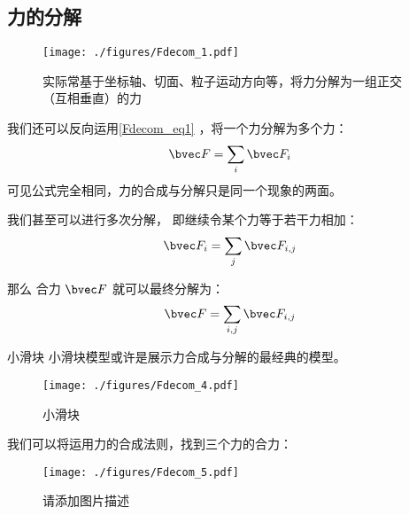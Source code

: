 \subsection{力的分解}
\begin{figure}[ht]
\centering
\texttt{[image: ./figures/Fdecom\_1.pdf]}
\caption{实际常基于坐标轴、切面、粒子运动方向等，将力分解为一组正交（互相垂直）的力} \label{Fdecom_fig1}
\end{figure}
我们还可以反向运用\autoref{Fdecom_eq1} ，将一个力分解为多个力：
\begin{equation}
\bvec F = \sum_i \bvec F_{i}
\end{equation}
可见公式完全相同，力的合成与分解只是同一个现象的两面。

我们甚至可以进行多次分解， 即继续令某个力等于若干力相加：
\begin{equation}
\bvec F_i = \sum_j \bvec F_{i,j}
\end{equation}

那么 合力 $\bvec F$ 就可以最终分解为：
\begin{equation}
\bvec F = \sum_{i,j} \bvec F_{i,j}
\end{equation}


\begin{example}{小滑块}
小滑块模型或许是展示力合成与分解的最经典的模型。
\begin{figure}[ht]
\centering
\texttt{[image: ./figures/Fdecom\_4.pdf]}
\caption{小滑块} \label{Fdecom_fig4}
\end{figure}

我们可以将运用力的合成法则，找到三个力的合力：
\begin{figure}[ht]
\centering
\texttt{[image: ./figures/Fdecom\_5.pdf]}
\caption{请添加图片描述} \label{Fdecom_fig5}
\end{figure}

\end{example}

